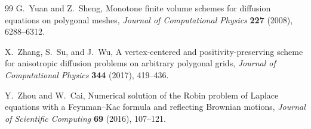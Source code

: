 \documentclass[11pt]{article}
\theoremstyle{definition}
\theoremstyle{remark}
\begin{document}
\begin{thebibliography}{99}
		G.~Yuan and Z.~Sheng,
		Monotone finite volume schemes for diffusion equations on polygonal meshes,
		\emph{Journal of Computational Physics} \textbf{227} (2008), 6288--6312.
		
		X.~Zhang, S.~Su, and J.~Wu,
		A vertex-centered and positivity-preserving scheme for anisotropic diffusion problems on arbitrary polygonal grids,
		\emph{Journal of Computational Physics} \textbf{344} (2017), 419--436.
		
		Y.~Zhou and W.~Cai,
		Numerical solution of the Robin problem of Laplace equations with a Feynman--Kac formula and reflecting Brownian motions,
		\emph{Journal of Scientific Computing} \textbf{69} (2016), 107--121.
		
	\end{thebibliography}
	
\end{document}
